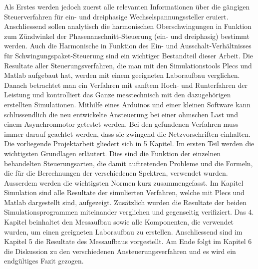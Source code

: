 Als Erstes werden jedoch zuerst alle relevanten Informationen über die gängigen Steuerverfahren für ein- und dreiphasige Wechselspannungssteller eruiert. Anschliessend sollen analytisch die harmonischen Oberschwingungen in Funktion zum Zündwinkel der Phasenanschnitt-Steuerung (ein- und dreiphasig) bestimmt werden. Auch die Harmonische in Funktion des Ein- und Ausschalt-Verhältnisses für Schwingungspaket-Steuerung sind ein wichtiger Bestandteil dieser Arbeit. Die Resultate aller Steuerungsverfahren, die man mit den Simulationstools Plecs und Matlab aufgebaut hat, werden mit einem geeigneten Laboraufbau verglichen. Danach betrachtet man ein Verfahren mit sanftem Hoch- und Runterfahren der Leistung und kontrolliert das Ganze messtechnisch mit den dazugehörigen erstellten Simulationen. Mithilfe eines Arduinos und einer kleinen Software kann schlussendlich die neu entwickelte Ansteuerung bei einer ohmschen Last und einem Asynchronmotor getestet werden. Bei den gefundenen Verfahren muss immer darauf geachtet werden, dass sie zwingend die Netzvorschriften einhalten.\\
Die vorliegende Projektarbeit gliedert sich in 5 Kapitel. Im ersten Teil werden die wichtigsten Grundlagen erläutert. Dies sind die Funktion der einzelnen behandelten Steuerungsarten, die damit auftretenden Probleme und die Formeln, die für die Berechnungen der verschiedenen Spektren, verwendet wurden. Ausserdem werden die wichtigsten Normen kurz zusammengefasst. Im Kapitel Simulation sind alle Resultate der simulierten Verfahren, welche mit Plecs und Matlab dargestellt sind, aufgezeigt. Zusätzlich wurden die Resultate der beiden Simulationsprogrammen miteinander verglichen und gegenseitig verifiziert. Das 4. Kapitel beinhaltet den Messaufbau sowie alle Komponenten, die verwendet wurden, um einen geeigneten Laboraufbau zu erstellen. Anschliessend sind im Kapitel 5 die Resultate des Messaufbaus vorgestellt. Am Ende folgt im Kapitel 6 die Diskussion zu den verschiedenen Ansteuerungsverfahren und es wird ein endgültiges Fazit gezogen.





















